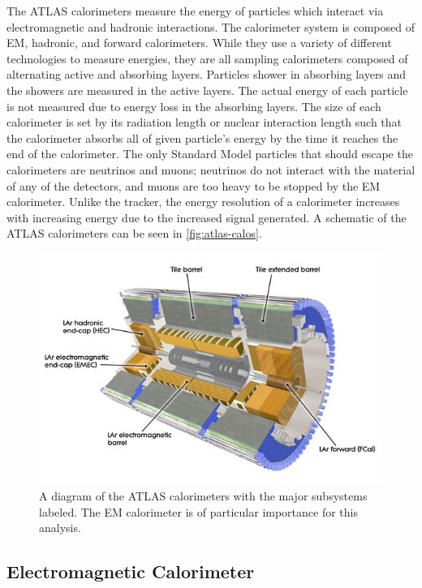 The \ac{ATLAS} calorimeters measure the energy of particles which interact via electromagnetic and hadronic interactions. The calorimeter system is composed of \ac{EM}, hadronic, and forward calorimeters. While they use a variety of different technologies to measure energies, they are all sampling calorimeters composed of alternating active and absorbing layers. Particles shower in absorbing layers and the showers are measured in the active layers. The actual energy of each particle is not measured due to energy loss in the absorbing layers. The size of each calorimeter is set by its radiation length or nuclear interaction length such that the calorimeter absorbs all of given particle's energy by the time it reaches the end of the calorimeter. The only Standard Model particles that should escape the calorimeters are neutrinos and muons; neutrinos do not interact with the material of any of the detectors, and muons are too heavy to be stopped by the EM calorimeter. Unlike the tracker, the energy resolution of a calorimeter increases with increasing energy due to the increased signal generated.  A schematic of the \ac{ATLAS} calorimeters can be seen in \autoref{fig:atlas-calos}.


\begin{figure}[!h]
\centering
\includegraphics[width=.8\textwidth]{figures/Detector/atlas-calorimeters.jpg}
\caption{A diagram of the \ac{ATLAS} calorimeters with the major subsystems labeled. The \ac{EM} calorimeter is of particular importance for this analysis. \cite{calorimeters}}
\label{fig:atlas-calos}
\end{figure}


\subsection{Electromagnetic Calorimeter}

